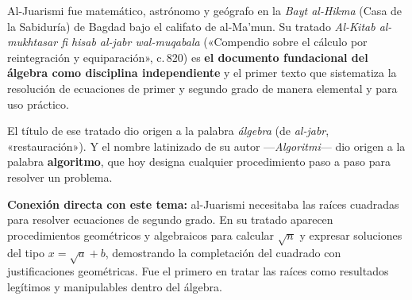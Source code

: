 \documentclass[11pt, letterpaper]{article}
\begin{document}
\vspace{0.7cm}


\begin{tcolorbox}[enhanced, breakable,
  colback=white, colframe=blockc, colbacktitle=blockc,
  coltitle=white, arc=4pt, leftrule=5pt,
  left=10pt, right=10pt, top=12pt, bottom=10pt,
  fonttitle=\bfseries,
  attach boxed title to top left={xshift=0.5cm, yshift*=-\tcboxedtitleheight/2},
  boxed title style={colframe=blockc, colback=blockc, arc=2pt},
  title={Muhammad ibn M\={u}s\={a} al-Juarismi \hfill \normalfont\itshape c.\,780 — 850 d.C.}]

\begin{minipage}[t]{0.78\linewidth}
\vspace{0pt}

Al-Juarismi fue matemático, astrónomo y geógrafo en la \textit{Bayt al-Hikma} (Casa de la Sabiduría) de Bagdad bajo el califato de al-Ma'mun. Su tratado \textit{Al-Kitab al-mukhtasar fi hisab al-jabr wal-muqabala} («Compendio sobre el cálculo por reintegración y equiparación», c.\,820) es \textbf{el documento fundacional del álgebra como disciplina independiente} y el primer texto que sistematiza la resolución de ecuaciones de primer y segundo grado de manera elemental y para uso práctico.

\medskip
El título de ese tratado dio origen a la palabra \textit{álgebra} (de \textit{al-jabr}, «restauración»). Y el nombre latinizado de su autor —\textit{Algoritmi}— dio origen a la palabra \textbf{algoritmo}, que hoy designa cualquier procedimiento paso a paso para resolver un problema.

\medskip
\textbf{Conexión directa con este tema:} al-Juarismi necesitaba las raíces cuadradas para resolver ecuaciones de segundo grado. En su tratado aparecen procedimientos geométricos y algebraicos para calcular $\sqrt{n}$ y expresar soluciones del tipo $x = \sqrt{a} + b$, demostrando la completación del cuadrado con justificaciones geométricas. Fue el primero en tratar las raíces como resultados legítimos y manipulables dentro del álgebra.
\end{minipage}
\hfill
\begin{minipage}[t]{0.18\linewidth}
\vspace{0pt}
\end{minipage}

\end{tcolorbox}
\end{document}
